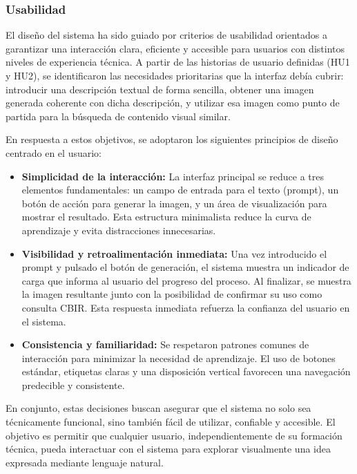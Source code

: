 \subsubsection{Usabilidad}
El diseño del sistema ha sido guiado por criterios de usabilidad orientados a garantizar una interacción clara, eficiente y accesible para usuarios con distintos niveles de experiencia técnica. A partir de las historias de usuario definidas (HU1 y HU2), se identificaron las necesidades prioritarias que la interfaz debía cubrir: introducir una descripción textual de forma sencilla, obtener una imagen generada coherente con dicha descripción, y utilizar esa imagen como punto de partida para la búsqueda de contenido visual similar.

En respuesta a estos objetivos, se adoptaron los siguientes principios de diseño centrado en el usuario:
\begin{itemize}
    \item \textbf{Simplicidad de la interacción:} La interfaz principal se reduce a tres elementos fundamentales: un campo de entrada para el texto (prompt), un botón de acción para generar la imagen, y un área de visualización para mostrar el resultado. Esta estructura minimalista reduce la curva de aprendizaje y evita distracciones innecesarias.
    
    \item \textbf{Visibilidad y retroalimentación inmediata:} Una vez introducido el prompt y pulsado el botón de generación, el sistema muestra un indicador de carga que informa al usuario del progreso del proceso. Al finalizar, se muestra la imagen resultante junto con la posibilidad de confirmar su uso como consulta CBIR. Esta respuesta inmediata refuerza la confianza del usuario en el sistema.
    
    \item \textbf{Consistencia y familiaridad:} Se respetaron patrones comunes de interacción para minimizar la necesidad de aprendizaje. El uso de botones estándar, etiquetas claras y una disposición vertical favorecen una navegación predecible y consistente.
\end{itemize}

En conjunto, estas decisiones buscan asegurar que el sistema no solo sea técnicamente funcional, sino también fácil de utilizar, confiable y accesible. El objetivo es permitir que cualquier usuario, independientemente de su formación técnica, pueda interactuar con el sistema para explorar visualmente una idea expresada mediante lenguaje natural.
